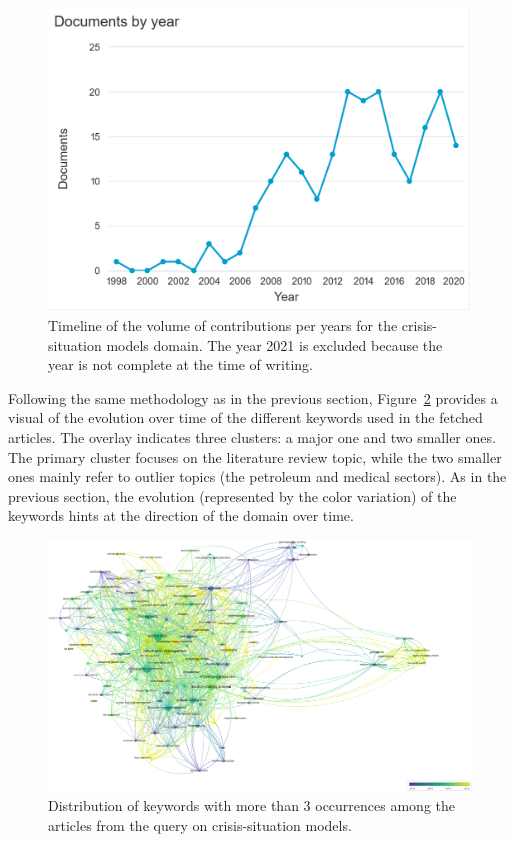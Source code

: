 \begin{figure}[thb]
    \includegraphics[width=\textwidth]{figures/chap-2/situation-models-hist.pdf}
    \caption{Timeline of the volume of contributions per years for the crisis-situation models domain. The year 2021 is excluded because the year is not complete at the time of writing.}
    \label{literature:situation-models-hist}
\end{figure}

Following the same methodology as in the previous section, Figure~\ref{literature:situation-models-overlay} provides a visual of the evolution over time of the different keywords used in the fetched articles.
The overlay indicates three clusters: a major one and two smaller ones.
The primary cluster focuses on the literature review topic, while the two smaller ones mainly refer to outlier topics (the petroleum and medical sectors).
As in the previous section, the evolution (represented by the color variation) of the keywords hints at the direction of the domain over time.

\begin{landscape}
    \begin{figure}[hp]
        \includegraphics[width=\paperwidth,height=\paperheight,keepaspectratio]{figures/chap-2/situation-models-overlay.pdf}
        \caption{Distribution of keywords with more than 3 occurrences among the articles from the query on crisis-situation models.}
        \label{literature:situation-models-overlay}
    \end{figure}
\end{landscape}

